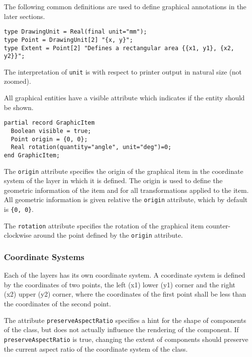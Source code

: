 The following common definitions are used to define graphical annotations in the later sections.
\begin{lstlisting}[language=modelica]
type DrawingUnit = Real(final unit="mm");
type Point = DrawingUnit[2] "{x, y}";
type Extent = Point[2] "Defines a rectangular area {{x1, y1}, {x2, y2}}";
\end{lstlisting}%
The interpretation of \lstinline!unit! is with respect to printer output in natural size (not zoomed).

All graphical entities have a visible attribute which indicates if the entity should be shown.
\begin{lstlisting}[language=modelica]
partial record GraphicItem
  Boolean visible = true;
  Point origin = {0, 0};
  Real rotation(quantity="angle", unit="deg")=0;
end GraphicItem;
\end{lstlisting}%
The \lstinline!origin! attribute specifies the origin of the graphical item in the coordinate system of the layer in which it is defined.
The origin is used to define the geometric information of the item and for all transformations applied to the item.
All geometric information is given relative the \lstinline!origin! attribute, which by default is \lstinline!{0, 0}!.

The \lstinline!rotation! attribute specifies the rotation of the graphical item
counter-clockwise around the point defined by the \lstinline!origin! attribute.

\subsubsection{Coordinate Systems}\label{coordinate-systems}

Each of the layers has its own coordinate system.
A coordinate system is defined by the coordinates of two points, the left (x1) lower (y1) corner and the right (x2) upper (y2) corner, where the coordinates of the first point shall be less than the coordinates of the second point.

The attribute \lstinline!preserveAspectRatio! specifies a hint for the shape of
components of the class, but does not actually influence the rendering of the component.
If \lstinline!preserveAspectRatio! is true, changing the
extent of components should preserve the current aspect ratio of the coordinate
system of the class.

